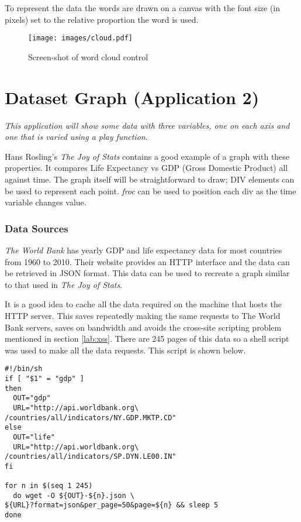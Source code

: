 To represent the data the words are drawn on a canvas with the font size (in pixels) set to the relative proportion the word is used.

\begin{figure}
  \centering
  \texttt{[image: images/cloud.pdf]}
  \caption{Screen-shot of word cloud control}
  \label{fig:cloud}
\end{figure}

\section{Dataset Graph (Application 2)}
\label{lab:ds-graph}
\emph{This application will show some data with three variables, one on each axis and one that is varied using a \emph{play} function}.

Hans Rosling's \emph{The Joy of Stats}\cite{bib:stats} contains a good example of a graph with these properties. It compares Life Expectancy vs GDP (Gross Domestic Product) all against time. The graph itself will be straightforward to draw; DIV elements can be used to represent each point. \emph{froc} can be used to position each div as the time variable changes value.

\subsubsection{Data Sources}
\emph{The World Bank} has yearly GDP and life expectancy data for most countries from 1960 to 2010. Their website provides an HTTP interface and the data can be retrieved in JSON format. This data can be used to recreate a graph similar to that used in \emph{The Joy of Stats}.

It is a good idea to cache all the data required on the machine that hosts the HTTP server. This saves repeatedly making the same requests to The World Bank servers, saves on bandwidth and avoids the cross-site scripting problem mentioned in section \ref{lab:xss}. There are 245 pages of this data so a shell script was used to make all the data requests. This script is shown below.

\lstset{language=bash}
\begin{lstlisting}
#!/bin/sh
if [ "$1" = "gdp" ]
then
  OUT="gdp"
  URL="http://api.worldbank.org\
/countries/all/indicators/NY.GDP.MKTP.CD"
else
  OUT="life"
  URL="http://api.worldbank.org\
/countries/all/indicators/SP.DYN.LE00.IN"
fi

for n in $(seq 1 245)
  do wget -O ${OUT}-${n}.json \
${URL}?format=json&per_page=50&page=${n} && sleep 5
done
\end{lstlisting}
\lstset{language=caml}

